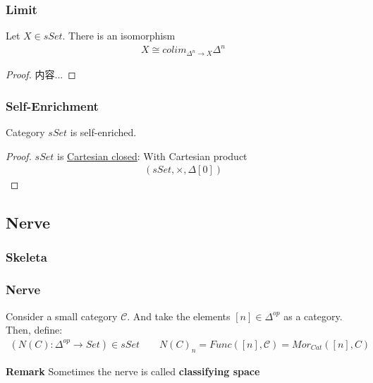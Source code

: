 \documentclass[Total.tex]{subfiles}
\begin{document}
				\subsubsection{Limit}
				
				\begin{proposition}
					Let $X\in sSet$. There is an isomorphism
					\begin{gather*}
						X\cong colim_{\Delta^n\rightarrow X} \Delta^n
					\end{gather*}
				\end{proposition}
				\begin{proof}
					内容...
				\end{proof}
				
				\subsubsection{Self-Enrichment}
				
				\begin{proposition}
					Category $sSet$ is self-enriched.
				\end{proposition}
				\begin{proof}
					$sSet$ is \underline{Cartesian closed}: With Cartesian product
					\begin{gather*}
						(sSet,\times,\Delta[0])
					\end{gather*}
				\end{proof}
				
			\subsection{Nerve}
				
				\subsubsection{Skeleta}
				\subsubsection{Nerve}
				\begin{Def}
					Consider a small category $\mathcal{C}$. And take the elements $[n]\in \Delta^{op}$ as a category. Then, define:
					\begin{gather*}
						(N(C):\Delta^{op}\rightarrow Set)\in sSet\qquad N(C)_n=Func([n],\mathcal{C})=Mor_{Cat}([n],C)
					\end{gather*}
					
					\textbf{Remark} Sometimes the nerve is called \textbf{classifying space}
				\end{Def}
				
\end{document}
